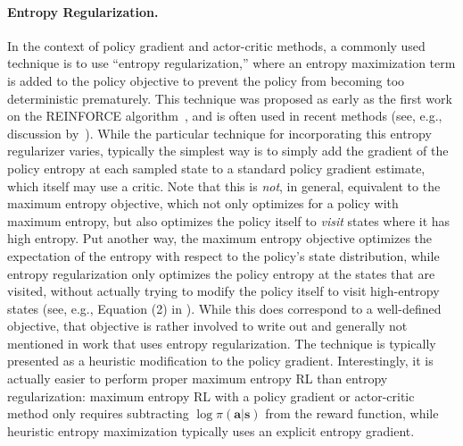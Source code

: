 \paragraph{Entropy Regularization.} In the context of policy gradient and actor-critic methods, a commonly used technique is to use ``entropy regularization,'' where an entropy maximization term is added to the policy objective to prevent the policy from becoming too deterministic prematurely. This technique was proposed as early as the first work on the REINFORCE algorithm~\citep{WilliamsPeng91,williams}, and is often used in recent methods (see, e.g., discussion by~\citet{pgq}). While the particular technique for incorporating this entropy regularizer varies, typically the simplest way is to simply add the gradient of the policy entropy at each sampled state to a standard policy gradient estimate, which itself may use a critic. Note that this is \emph{not}, in general, equivalent to the maximum entropy objective, which not only optimizes for a policy with maximum entropy, but also optimizes the policy itself to \emph{visit} states where it has high entropy. Put another way, the maximum entropy objective optimizes the expectation of the entropy with respect to the policy's state distribution, while entropy regularization only optimizes the policy entropy at the states that are visited, without actually trying to modify the policy itself to visit high-entropy states (see, e.g., Equation (2) in \citet{pgq}). While this does correspond to a well-defined objective, that objective is rather involved to write out and generally not mentioned in work that uses entropy regularization. The technique is typically presented as a heuristic modification to the policy gradient. Interestingly, it is actually easier to perform proper maximum entropy RL than entropy regularization: maximum entropy RL with a policy gradient or actor-critic method only requires subtracting $\log \pi(\mathbf{a}|\mathbf{s})$ from the reward function, while heuristic entropy maximization typically uses an explicit entropy gradient.


